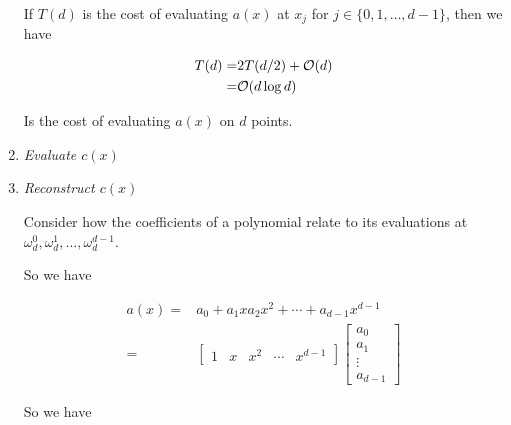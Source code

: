 \documentclass[12pt]{article}
\begin{document}
\begin{enumerate}
{        %
      }

      If $T(d)$ is the cost of evaluating $a(x)$ at $x_j$ for $j \in \{0, 1,
      \dots, d - 1\}$, then we have

      \begin{align*}
        T(d) =&2T(d / 2) + \mathcal O(d) \\
             =&\mathcal O(d \log d)
      \end{align*}

      Is the cost of evaluating $a(x)$ on $d$ points.


    \item {\it Evaluate $c(x)$}


    \item {\it Reconstruct $c(x)$}

      Consider how the coefficients of a polynomial relate to its evaluations at
      $\omega_d^0, \omega_d^1, \dots, \omega_d^{d - 1}$.

      So we have

      \begin{align*}
        a(x) =&a_0 + a_1 x a_2 x^2 + \cdots + a_{d - 1} x^{d - 1} \\
        =&\begin{bmatrix}
          1 & x & x^2 & \cdots & x^{d - 1}
        \end{bmatrix}
        \begin{bmatrix}
          a_0 \\
          a_1 \\
          \vdots \\
          a_{d - 1}
        \end{bmatrix}
      \end{align*}

      So we have


\end{enumerate}
\end{document}
